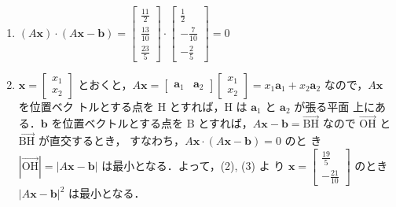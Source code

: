\documentclass[11pt, uplatex, dvipdfmx]{jsarticle}
\renewcommand*{\vec}[1]{\overrightarrow{\textrm{#1}}}
\begin{document}
\begin{enumerate}
\begin{enumerate}[(1)]
    
  \item $(A\bm{x}) \cdot (A\bm{x}-\bm{b}) = \left[
      \begin{array}{r}
        \frac{11}{2}\\
        \frac{13}{10}\\
        \frac{23}{5}
      \end{array}
    \right] \cdot \left[
      \begin{array}{r}
        \frac{1}{2}\\
        -\frac{7}{10}\\
        -\frac{2}{5}
      \end{array}
    \right]=0$
    
  \item $\bm{x}=\left[
      \begin{array}{c}
        x_1\\
        x_2
      \end{array}
    \right]$ とおくと，$A\bm{x} = \left[
      \begin{array}{cc}
        \bm{a}_1 & \bm{a}_2
      \end{array}
    \right] \left[
      \begin{array}{c}
        x_1\\
        x_2
      \end{array}
    \right] = x_1 \bm{a}_1 + x_2 \bm{a}_2$ なので，$A\bm{x}$ を位置ベク
    トルとする点を H とすれば，H は $\bm{a}_1$ と $\bm{a}_2$ が張る平面
    上にある．$\bm{b}$ を位置ベクトルとする点を B とすれば，$A\bm{x} -
    \bm{b} = \vec{BH}$ なので $\vec{OH}$ と $\vec{BH}$ が直交するとき，
    すなわち，$A\bm{x} \cdot (A\bm{x}-\bm{b})=0$ のと
    き $|\vec{OH}|=|A\bm{x}-\bm{b}|$ は最小となる．よって，(2), (3) よ
    り $\bm{x}=\left[
      \begin{array}{r}
        \frac{19}{5}\\
        -\frac{21}{10}
      \end{array}
    \right]$ のとき $|A\bm{x}-\bm{b}|^2$ は最小となる．
  \end{enumerate}

\end{enumerate}
\end{document}
